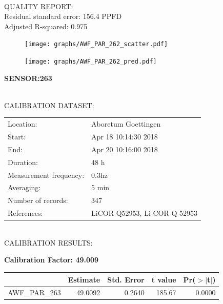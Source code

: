 \documentclass[oneside]{report}
\begin{document}
\hrulefill\\
QUALITY REPORT:\\
Residual standard error: 156.4 PPFD\\
Adjusted R-squared: 0.975



\begin{figure}[H]
  \centering
  \texttt{[image: graphs/AWF\_PAR\_262\_scatter.pdf]}
\end{figure}




\begin{figure}[H]
  \centering
  \texttt{[image: graphs/AWF\_PAR\_262\_pred.pdf]}
\end{figure}

\pagebreak


\begin{center}
\large{\textbf{SENSOR:263}}\\
\end{center}

\hrulefill\\
CALIBRATION DATASET:\\
\begin{table}[h!]
  \centering
  \label{tab:table1}
  \begin{tabular}{ll}
    Location: & Aboretum Goettingen\\ 
    
    
    Start:  & Apr 18 10:14:30 2018 \\
    End:   & Apr 20 10:16:00 2018\\ 
    Duration: & 48 h\\
    Measurement frequency: & 0.3hz\\
    Averaging:  &5 min\\
    Number of records: & 347 \\
    References: & LiCOR Q52953, Li-COR Q 52953 \\
  \end{tabular}
\end{table}

\hrulefill\\
CALIBRATION RESULTS:\\


\begin{center}
\textbf{\large{Calibration Factor: 49.009}}\\
\end{center}
\begin{table}[ht]
\centering
\begin{tabular}{rrrrr}
  \hline
 & Estimate & Std. Error & t value & Pr($>$$|$t$|$) \\ 
  \hline
AWF\_PAR\_263 & 49.0092 & 0.2640 & 185.67 & 0.0000 \\ 
   \hline
\end{tabular}
\end{table}
\end{document}
